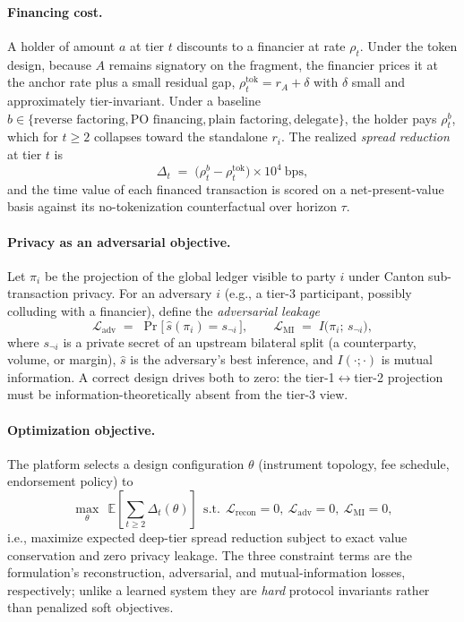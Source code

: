 \documentclass[10pt,twocolumn,letterpaper]{article}
\begin{document}
\paragraph{Financing cost.} A holder of amount $a$ at tier $t$ discounts to a
financier at rate $\rho_t$. Under the token design, because $A$ remains signatory on
the fragment, the financier prices it at the anchor rate plus a small residual gap,
$\rho_t^{\mathrm{tok}} = r_A + \delta$ with $\delta$ small and approximately
tier-invariant. Under a baseline $b\in\{\text{reverse factoring}, \text{PO
financing}, \text{plain factoring}, \text{delegate}\}$, the holder pays
$\rho_t^{b}$, which for $t\ge 2$ collapses toward the standalone $r_i$. The realized
\emph{spread reduction} at tier $t$ is
\begin{equation}
\Delta_t \;=\; \big(\rho_t^{b}-\rho_t^{\mathrm{tok}}\big)\times 10^4 \ \text{bps},
\label{eq:spread}
\end{equation}
and the time value of each financed transaction is scored on a net-present-value
basis against its no-tokenization counterfactual over horizon $\tau$.

\paragraph{Privacy as an adversarial objective.} Let $\pi_i$ be the projection of the
global ledger visible to party $i$ under Canton sub-transaction privacy. For an
adversary $i$ (e.g., a tier-3 participant, possibly colluding with a financier),
define the \emph{adversarial leakage}
\begin{equation}
\mathcal{L}_{\mathrm{adv}} \;=\;
\Pr\!\big[\,\hat{s}(\pi_i)=s_{\neg i}\,\big],
\qquad
\mathcal{L}_{\mathrm{MI}} \;=\; I\big(\pi_i;\, s_{\neg i}\big),
\label{eq:privacy}
\end{equation}
where $s_{\neg i}$ is a private secret of an upstream bilateral split (a
counterparty, volume, or margin), $\hat s$ is the adversary's best inference, and
$I(\cdot;\cdot)$ is mutual information. A correct design drives both to zero: the
tier-1$\leftrightarrow$tier-2 projection must be information-theoretically absent from
the tier-3 view.

\paragraph{Optimization objective.} The platform selects a design configuration
$\theta$ (instrument topology, fee schedule, endorsement policy) to
\begin{equation}
\max_{\theta}\ \ \mathbb{E}\!\left[\sum_{t\ge 2}\Delta_t(\theta)\right]
\ \ \text{s.t.}\ \
\mathcal{L}_{\mathrm{recon}}=0,\
\mathcal{L}_{\mathrm{adv}}=0,\
\mathcal{L}_{\mathrm{MI}}=0,
\label{eq:objective}
\end{equation}
i.e., maximize expected deep-tier spread reduction subject to exact value
conservation and zero privacy leakage. The three constraint terms are the
formulation's reconstruction, adversarial, and mutual-information losses,
respectively; unlike a learned system they are \emph{hard} protocol invariants rather
than penalized soft objectives.
\end{document}
